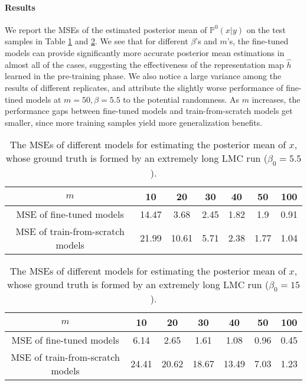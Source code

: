\documentclass[11pt]{article}
\numberwithin{equation}{section}
\begin{document}
\paragraph{Results}
We report the MSEs of the estimated posterior mean of $\mathbb{P}^0(x|y)$ on the test samples in Table \ref{tab:beta=5.5} and \ref{tab:beta=15}.
We see that for different $\beta$'s and $m$'s, the fine-tuned models can provide significantly more accurate posterior mean estimations in almost all of the cases, suggesting the effectiveness of the representation map $\widehat{h}$ learned in the pre-training phase.
We also notice a large variance among the results of different replicates, and attribute the slightly worse performance of fine-tined models at $m=50,\beta=5.5$ to the potential randomness.
As $m$ increases, the performance gaps between fine-tuned models and train-from-scratch models get smaller, since more training samples yield more generalization benefits.

\begin{table}[ht]
    \centering
    \begin{tabular}{ccccccc}
    \toprule
    $m$ & 10 & 20 & 30 & 40 & 50 & 100 \\
    \midrule
    MSE of fine-tuned models & 14.47 & 3.68 & 2.45 & 1.82 & 1.9  & 0.91 \\
    MSE of train-from-scratch models  & 21.99 &10.61 & 5.71 & 2.38 & 1.77&  1.04\\
    \bottomrule
    \end{tabular}
    \caption{The MSEs of different models for estimating the posterior mean of $x$, whose ground truth is formed by an extremely long LMC run ($\beta_0=5.5$).}
    \label{tab:beta=5.5}
\end{table}


\begin{table}[ht]
    \centering
    \begin{tabular}{ccccccc}
    \toprule
    $m$ & 10 & 20 & 30 & 40 & 50 & 100 \\
    \midrule
    MSE of fine-tuned models & 6.14 &2.65& 1.61& 1.08 &0.96& 0.45\\
    MSE of train-from-scratch models  & 24.41& 20.62 &18.67 &13.49&  7.03 & 1.23\\
    \bottomrule
    \end{tabular}
    \caption{The MSEs of different models for estimating the posterior mean of $x$, whose ground truth is formed by an extremely long LMC run ($\beta_0=15$).}
    \label{tab:beta=15}
\end{table}
\end{document}
